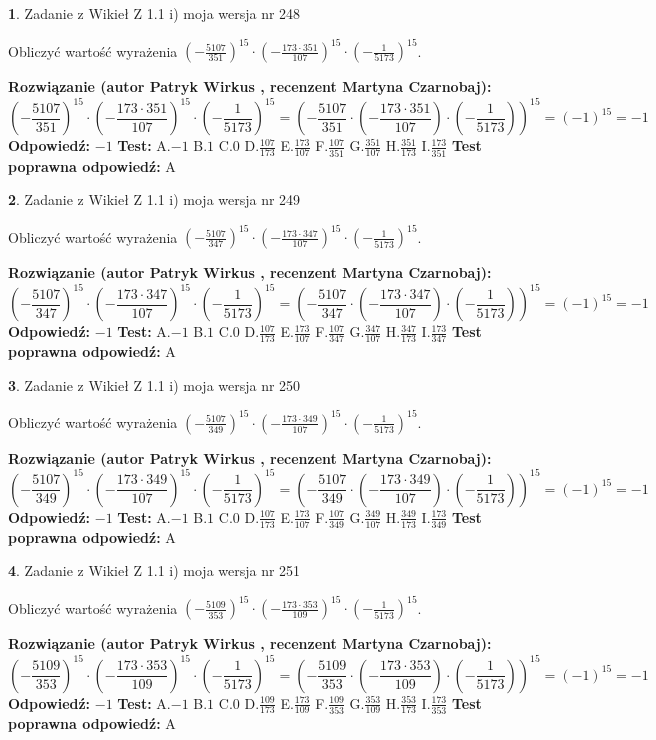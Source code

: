 \documentclass[12pt, a4paper]{article}
\theoremstyle{definition} %
\newtheorem{zad}{}
\newcommand{\zadStart}[1]{\begin{zad}#1\newline}
\newcommand{\zadStop}{\end{zad}}
\newcommand{\rozwStart}[2]{\noindent \textbf{Rozwiązanie (autor #1 , recenzent #2): }\newline}
\newcommand{\rozwStop}{\newline}
\newcommand{\odpStart}{\noindent \textbf{Odpowiedź:}\newline}
\newcommand{\odpStop}{\newline}
\newcommand{\testStart}{\noindent \textbf{Test:}\newline}
\newcommand{\testStop}{\newline}
\newcommand{\kluczStart}{\noindent \textbf{Test poprawna odpowiedź:}\newline}
\newcommand{\kluczStop}{\newline}
\begin{document}
\zadStart{Zadanie z Wikieł Z 1.1 i) moja wersja nr 248}

Obliczyć wartość wyrażenia $(-\frac{5107}{351})^{15} \cdot (-\frac{173 \cdot 351}{107})^{15} \cdot (-\frac{1}{5173})^{15}$.
\zadStop
\rozwStart{Patryk Wirkus}{Martyna Czarnobaj}
$$(-\frac{5107}{351})^{15} \cdot (-\frac{173 \cdot 351}{107})^{15} \cdot (-\frac{1}{5173})^{15} = (-\frac{5107}{351} \cdot (-\frac{173 \cdot 351}{107}) \cdot (-\frac{1}{5173}))^{15} = (-1)^{15} = -1$$
\rozwStop
\odpStart
$-1$
\odpStop
\testStart
A.$-1$ B.$1$ C.$0$ D.$\frac{107}{173}$ E.$\frac{173}{107}$
F.$\frac{107}{351}$ G.$\frac{351}{107}$
H.$\frac{351}{173}$
I.$\frac{173}{351}$
\testStop
\kluczStart
A
\kluczStop



\zadStart{Zadanie z Wikieł Z 1.1 i) moja wersja nr 249}

Obliczyć wartość wyrażenia $(-\frac{5107}{347})^{15} \cdot (-\frac{173 \cdot 347}{107})^{15} \cdot (-\frac{1}{5173})^{15}$.
\zadStop
\rozwStart{Patryk Wirkus}{Martyna Czarnobaj}
$$(-\frac{5107}{347})^{15} \cdot (-\frac{173 \cdot 347}{107})^{15} \cdot (-\frac{1}{5173})^{15} = (-\frac{5107}{347} \cdot (-\frac{173 \cdot 347}{107}) \cdot (-\frac{1}{5173}))^{15} = (-1)^{15} = -1$$
\rozwStop
\odpStart
$-1$
\odpStop
\testStart
A.$-1$ B.$1$ C.$0$ D.$\frac{107}{173}$ E.$\frac{173}{107}$
F.$\frac{107}{347}$ G.$\frac{347}{107}$
H.$\frac{347}{173}$
I.$\frac{173}{347}$
\testStop
\kluczStart
A
\kluczStop



\zadStart{Zadanie z Wikieł Z 1.1 i) moja wersja nr 250}

Obliczyć wartość wyrażenia $(-\frac{5107}{349})^{15} \cdot (-\frac{173 \cdot 349}{107})^{15} \cdot (-\frac{1}{5173})^{15}$.
\zadStop
\rozwStart{Patryk Wirkus}{Martyna Czarnobaj}
$$(-\frac{5107}{349})^{15} \cdot (-\frac{173 \cdot 349}{107})^{15} \cdot (-\frac{1}{5173})^{15} = (-\frac{5107}{349} \cdot (-\frac{173 \cdot 349}{107}) \cdot (-\frac{1}{5173}))^{15} = (-1)^{15} = -1$$
\rozwStop
\odpStart
$-1$
\odpStop
\testStart
A.$-1$ B.$1$ C.$0$ D.$\frac{107}{173}$ E.$\frac{173}{107}$
F.$\frac{107}{349}$ G.$\frac{349}{107}$
H.$\frac{349}{173}$
I.$\frac{173}{349}$
\testStop
\kluczStart
A
\kluczStop



\zadStart{Zadanie z Wikieł Z 1.1 i) moja wersja nr 251}

Obliczyć wartość wyrażenia $(-\frac{5109}{353})^{15} \cdot (-\frac{173 \cdot 353}{109})^{15} \cdot (-\frac{1}{5173})^{15}$.
\zadStop
\rozwStart{Patryk Wirkus}{Martyna Czarnobaj}
$$(-\frac{5109}{353})^{15} \cdot (-\frac{173 \cdot 353}{109})^{15} \cdot (-\frac{1}{5173})^{15} = (-\frac{5109}{353} \cdot (-\frac{173 \cdot 353}{109}) \cdot (-\frac{1}{5173}))^{15} = (-1)^{15} = -1$$
\rozwStop
\odpStart
$-1$
\odpStop
\testStart
A.$-1$ B.$1$ C.$0$ D.$\frac{109}{173}$ E.$\frac{173}{109}$
F.$\frac{109}{353}$ G.$\frac{353}{109}$
H.$\frac{353}{173}$
I.$\frac{173}{353}$
\testStop
\kluczStart
A
\kluczStop
\end{document}
